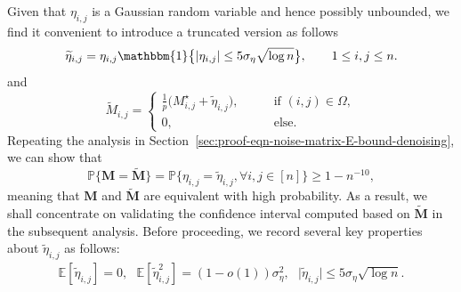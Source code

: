 Given that $\eta_{i,j}$ is a Gaussian random variable and hence possibly
unbounded, we find it convenient to introduce a truncated version
as follows
%
\[
	\widetilde{\eta}_{i,j}=\eta_{i,j}\mathbbm{1}\big\{|\eta_{i,j}|\leq 5\sigma_{\eta}\sqrt{\log n}\big\},\qquad1\leq i,j\leq n.
\]
%
and 
%
\[
	\widetilde{M}_{i,j} = \begin{cases} \frac{1}{p} \big( M_{i,j}^{\star} + \widetilde{\eta}_{i,j} \big), \qquad & \text{if } (i,j)\in \Omega, \\ 0, &\text{else}. \end{cases}
\]
%
Repeating the analysis in Section~\ref{sec:proof-eqn-noise-matrix-E-bound-denoising}, we can show that 
%
\[
	\mathbb{P}\big\{ \bm{M} = \widetilde{\bm{M}} \big\}
	= \mathbb{P} \big\{ \eta_{i,j} = \widetilde{\eta}_{i,j}, \forall i,j\in [n] \big\} 
	\geq 1- n^{-10},
\]
%
meaning that  $\bm{M}$ and $\widetilde{\bm{M}}$ are equivalent with high probability. 
As a result, we shall concentrate on validating the confidence interval computed based on $\widetilde{\bm{M}}$ in the subsequent analysis. %
Before proceeding, we record several key properties about  $\widetilde{\eta}_{i,j}$ as follows:
%
\begin{align}
	\mathbb{E}[ \widetilde{\eta}_{i,j}] = 0, ~~~ \mathbb{E}[ \widetilde{\eta}^2_{i,j}]=(1-o(1)) \sigma_{\eta}^2, 
	 ~~~ \big|\widetilde{\eta}_{i,j}\big|\leq  5\sigma_{\eta}\sqrt{\log n}.  
	 \label{eq:eta-property-CI-MC}
\end{align}
%
 


